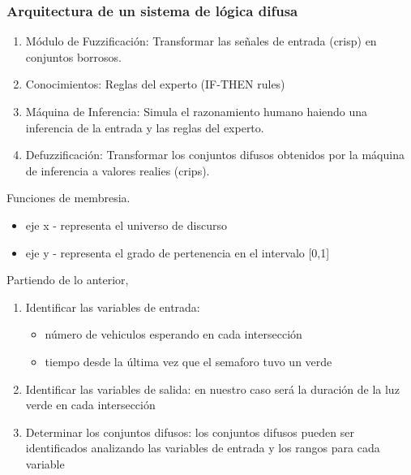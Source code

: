 \documentclass[
	11pt, %
]{beamer}
\begin{document}
\begin{frame}
  \frametitle{Arquitectura de un sistema de lógica difusa}

  \begin{enumerate}
  \item Módulo de Fuzzificación: Transformar las señales de entrada (crisp) en conjuntos borrosos.
  \item Conocimientos: Reglas del experto (IF-THEN rules)
  \item Máquina de Inferencia: Simula el razonamiento humano haiendo una inferencia de la entrada y las reglas del experto.
  \item Defuzzificación: Transformar los conjuntos difusos obtenidos por la máquina de inferencia a valores realies (crips).
  \end{enumerate}

  Funciones de membresia.
  \begin{itemize}
  \item eje x - representa el universo de discurso
  \item eje y - representa el grado de pertenencia en el intervalo [0,1]
  \end{itemize}
  
\end{frame}

\begin{frame}
  Partiendo de lo anterior,

  \begin{enumerate}
  \item Identificar las variables de entrada:
    
    \begin{itemize}
    \item número de vehiculos esperando en cada intersección
    \item tiempo desde la última vez que el semaforo tuvo un verde
    \end{itemize}

  \item Identificar las variables de salida: en nuestro caso será la duración de la luz verde en cada intersección

  \item Determinar los conjuntos difusos: los conjuntos difusos pueden ser identificados analizando las variables de entrada y los rangos para cada variable
  \end{enumerate}
\end{frame}
\end{document}
